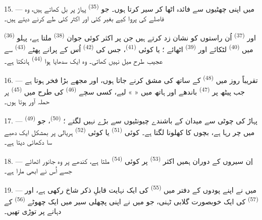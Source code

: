 \VUsaut{3.0mm}
\VUsaut{3.0mm}

15. --- میں اپنی چھٹیوں سے فائدہ اٹھا کر  سیر کرتا ہوں۔
جو  \textsuperscript{(35)} پہاڑ پر بل کھاتے ہیں، وہ
فاصلے کی پروا کیے بغیر کئی  اور اکثر کئی
 طے کرنے دیتے ہیں۔

 \textsuperscript{(36)} اور 
\textsuperscript{(37)} اُن راستوں کو نشان زد کرتے ہیں جن پر اکثر کوئی
جوان  \textsuperscript{(38)} ملتا ہے، پہلو میں
 \textsuperscript{(40)} لٹکائے اور 
\textsuperscript{(39)} اٹھائے ؛ یا کوئی 
\textsuperscript{(41)}، جس کی 
\textsuperscript{(42)} اُس کے پرانے پھٹے 
\textsuperscript{(43)} سے عجیب طرح میل نہیں کھاتی۔ وہ ایک سدھایا ہوا
 \textsuperscript{(44)} ہانکتا ہے۔

\VUsaut{3.0mm}

16. --- تقریباً روز میں  \textsuperscript{(48)} کے ساتھ
 کی مشق کرنے جاتا ہوں، اور مجھے بڑا فخر ہوتا ہے جب
پیٹھ پر  \textsuperscript{(47)} باندھے اور ہاتھ میں «
 » لیے، کسی سچے  \textsuperscript{(46)}
کی طرح میں  \textsuperscript{(45)} پر حملہ آور ہوتا
ہوں۔

17. --- پہاڑ کی چوٹی سے میدان کے باشندے چیونٹیوں سے بڑے نہیں لگتے ؛
 \textsuperscript{(50)}، جو 
\textsuperscript{(49)} میں چر رہا ہے، بچوں کا کھلونا لگتا ہے۔ کوئی
 \textsuperscript{(51)} یا کوئی 
\textsuperscript{(52)} ہریالی پر بمشکل ایک دھبے سا دکھائی دیتا ہے۔

18. --- اِن سیروں کے دوران ہمیں اکثر 
\textsuperscript{(53)} پر کوئی 
\textsuperscript{(54)} ملتا ہے، کندھے پر وہ جانور اٹھائے جسے اُس نے
ابھی مارا ہے۔

19. --- میں نے اپنے پودوں کے دفتر میں 
\textsuperscript{(55)} کی ایک نہایت قابلِ ذکر شاخ رکھی ہے، اور
 \textsuperscript{(57)} کی ایک خوبصورت گلابی ٹہنی، جو
میں نے اپنی پچھلی سیر میں ایک چھوٹے  \textsuperscript{(56)}
کے دہانے پر توڑی تھیں۔

\VUsaut{3.0mm}
\VUsaut{3.0mm}

